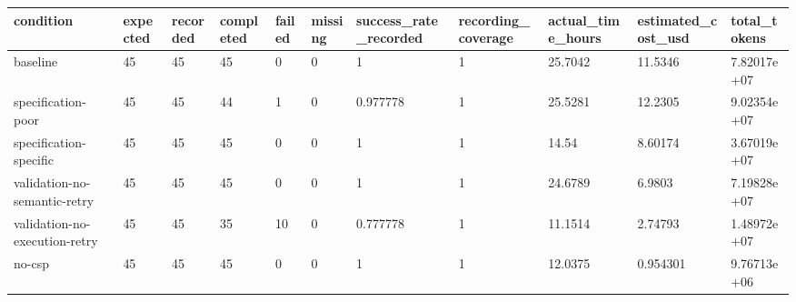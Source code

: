 \begin{tabular}{lllllllllll}
\hline
condition & expected & recorded & completed & failed & missing & success\_rate\_recorded & recording\_coverage & actual\_time\_hours & estimated\_cost\_usd & total\_tokens \\
\hline
baseline & 45 & 45 & 45 & 0 & 0 & 1 & 1 & 25.7042 & 11.5346 & 7.82017e+07 \\
specification-poor & 45 & 45 & 44 & 1 & 0 & 0.977778 & 1 & 25.5281 & 12.2305 & 9.02354e+07 \\
specification-specific & 45 & 45 & 45 & 0 & 0 & 1 & 1 & 14.54 & 8.60174 & 3.67019e+07 \\
validation-no-semantic-retry & 45 & 45 & 45 & 0 & 0 & 1 & 1 & 24.6789 & 6.9803 & 7.19828e+07 \\
validation-no-execution-retry & 45 & 45 & 35 & 10 & 0 & 0.777778 & 1 & 11.1514 & 2.74793 & 1.48972e+07 \\
no-csp & 45 & 45 & 45 & 0 & 0 & 1 & 1 & 12.0375 & 0.954301 & 9.76713e+06 \\
\hline
\end{tabular}
